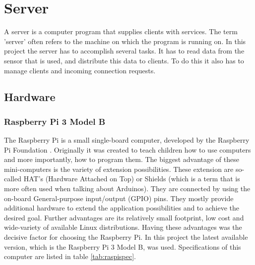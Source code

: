 \chapter{Server}
\label{ch:server}

\author{Nico Kratky}
%
A server is a computer program that supplies clients with services. The term 'server' often refers to the machine on which the program is running on. In this project the server has to accomplish several tasks. It has to read data from the sensor that is used, and distribute this data to clients. To do this it also has to manage clients and incoming connection requests.

\section{Hardware}
\subsection{Raspberry Pi 3 Model B}

The Raspberry Pi is a small single-board computer, developed by the Raspberry Pi Foundation \cite{RasPi}. Originally it was created to teach children how to use computers and more importantly, how to program them. The biggest advantage of these mini-computers is the variety of extension possibilities. These extension are so-called HAT's (Hardware Attached on Top) or Shields (which is a term that is more often used when talking about Arduinos). They are connected by using the on-board General-purpose input/output (GPIO) pins. They mostly provide additional hardware to extend the application possibilities and to achieve the desired goal. Further advantages are its relatively small footprint, low cost and wide-variety of available Linux distributions. Having these advantages was the decisive factor for choosing the Raspberry Pi. In this project the latest available version, which is the Raspberry Pi 3 Model B, was used. Specifications of this computer are listed in table \vref{tab:raspispec}.

